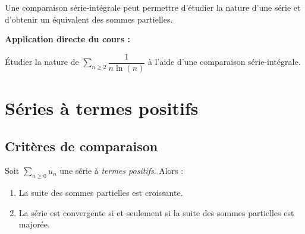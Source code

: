 \documentclass[french,11pt,twoside]{VcCours}
\newenvironment{ApplicationDirecte}{\textbf{Application directe du cours :}

}{}
\newcommand{\dx}{\text{d}x}
\newcommand{\Sum}[2]{\ensuremath{\textstyle{\sum\limits_{#1}^{#2}}}}
\begin{document}
\begin{Methode}{} Une comparaison série-intégrale peut permettre d'étudier la nature d'une série et d'obtenir un équivalent des sommes partielles.
\end{Methode}
%
%
%

\begin{ApplicationDirecte} Étudier la nature de $\Sum{n \geq 2}{}  \dfrac{1}{n\ln(n)}$ à l'aide d'une comparaison série-intégrale.
\end{ApplicationDirecte}
\section{Séries à termes positifs}
\subsection{Critères de comparaison}
\begin{Proposition}{}\label{SATP} Soit $\Sum{n \geq 0}{} u_n$ une série à \emph{termes positifs}. Alors :
\begin{enumerate}
\item La suite des sommes partielles est croissante.
\item La série est convergente si et seulement si la suite des sommes partielles est majorée.
\end{enumerate}
\end{Proposition}
\end{document}
